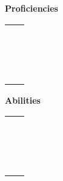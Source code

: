 \documentclass[green]{grimrock}
\begin{document}
\name{\gTalents{}}

{\bf Proficiencies}
\begin{table}[h]
\begin{tabular}{lp{14cm}}
{\bf \swordsa{}} &\swordsa{\MYtext}\\
{\bf \swordsb{}} &\swordsb{\MYtext}\\
{\bf \swordSpeed{}} &\swordSpeed{\MYtext}\\
{\bf \axea{}} &\axea{\MYtext}\\
{\bf \axeb{}} &\axeb{\MYtext}\\
{\bf \axeDam{}} &\axeDam{\MYtext}\\
{\bf \rangedb{}} &\rangedb{\MYtext}\\
{\bf \throwa{}} &\throwa{\MYtext}\\
{\bf \throwb{}} &\throwb{\MYtext}\\
{\bf \firea{}} &\firea{\MYtext}\\
{\bf \fireb{}} &\fireb{\MYtext}\\
{\bf \lightninga{}} &\lightninga{\MYtext}\\
{\bf \lightningb{}} &\lightningb{\MYtext}\\
{\bf \eartha{}} &\eartha{\MYtext}\\
{\bf \earhtb{}} &\earhtb{\MYtext}\\
{\bf \armor{}} &\armor{\MYtext}\\
\end{tabular}
\end{table}

{\bf Abilities}
\begin{table}[h]
\begin{tabular}{lp{14cm}}
{\bf \sack{}} &\sack{\MYtext}\\
{\bf \hp{}} &\hp{\MYtext}\\
{\bf \levitate{}} &\levitate{\MYtext}\\
{\bf \hpTransfer{}} &\hpTransfer{\MYtext}\\
{\bf \mem{}} &\mem{\MYtext}\\
{\bf \daze{}} &\daze{\MYtext}\\
{\bf \alchemy{}} &\alchemy{\MYtext}\\
{\bf \push{}} &\push{\MYtext}\\
{\bf \fireres{}} &\fireres{\MYtext}\\
{\bf \lightres{}} &\lightres{\MYtext}\\
{\bf \poires{}} &\poires{\MYtext}\\
{\bf \ammo{}} &\ammo{\MYtext}\\
{\bf \guard{}} &\guard{\MYtext}\\
{\bf \dodge{}} &\dodge{\MYtext}\\
{\bf \extraheal{}} &\extraheal{\MYtext}\\
{\bf \extraspeed{}} &\extraspeed{\MYtext}\\
\end{tabular}
\end{table}
\end{document}
